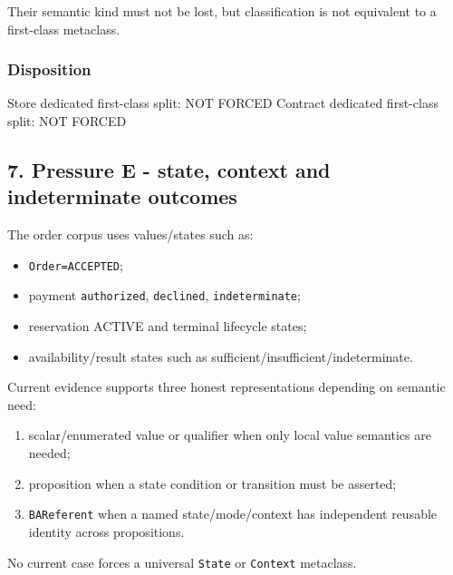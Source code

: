\documentclass[
  10pt,
]{article}
\newenvironment{Shaded}{}{}
\newcommand{\NormalTok}[1]{#1}
\providecommand{\tightlist}{%
  \setlength{\itemsep}{0pt}\setlength{\parskip}{0pt}}
\begin{document}
Their semantic kind must not be lost, but classification is not
equivalent to a first-class metaclass.

\subsubsection{Disposition}\label{disposition-3}

\begin{Shaded}
\begin{Highlighting}[]
\NormalTok{Store dedicated first{-}class split: NOT FORCED}
\NormalTok{Contract dedicated first{-}class split: NOT FORCED}
\end{Highlighting}
\end{Shaded}

\subsection{7. Pressure E - state, context and indeterminate
outcomes}\label{pressure-e---state-context-and-indeterminate-outcomes}

The order corpus uses values/states such as:

\begin{itemize}
\tightlist
\item
  \texttt{Order=ACCEPTED};
\item
  payment \texttt{authorized}, \texttt{declined},
  \texttt{indeterminate};
\item
  reservation ACTIVE and terminal lifecycle states;
\item
  availability/result states such as
  sufficient/insufficient/indeterminate.
\end{itemize}

Current evidence supports three honest representations depending on
semantic need:

\begin{enumerate}
\def\labelenumi{\arabic{enumi}.}
\tightlist
\item
  scalar/enumerated value or qualifier when only local value semantics
  are needed;
\item
  proposition when a state condition or transition must be asserted;
\item
  \texttt{BAReferent} when a named state/mode/context has independent
  reusable identity across propositions.
\end{enumerate}

No current case forces a universal \texttt{State} or \texttt{Context}
metaclass.
\end{document}
